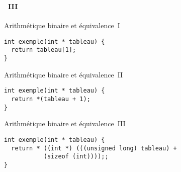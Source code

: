 \begin{frame}[containsverbatim]
  \frametitle{\secname}
  \framesubtitle{\subsecname~III}
  
  {\small\begin{exampleblock}{Arithmétique binaire et équivalence~I}
    \begin{verbatim}
int exemple(int * tableau) {
  return tableau[1];
}\end{verbatim}
  \end{exampleblock}

  \begin{exampleblock}{Arithmétique binaire et équivalence~II}
    \begin{verbatim}
int exemple(int * tableau) {
  return *(tableau + 1);
}\end{verbatim}
  \end{exampleblock}
  
  \begin{exampleblock}{Arithmétique binaire et équivalence~III}
    \begin{verbatim}
int exemple(int * tableau) {
  return * ((int *) (((unsigned long) tableau) +
           (sizeof (int))));;
}\end{verbatim}
  \end{exampleblock}}

\end{frame}

